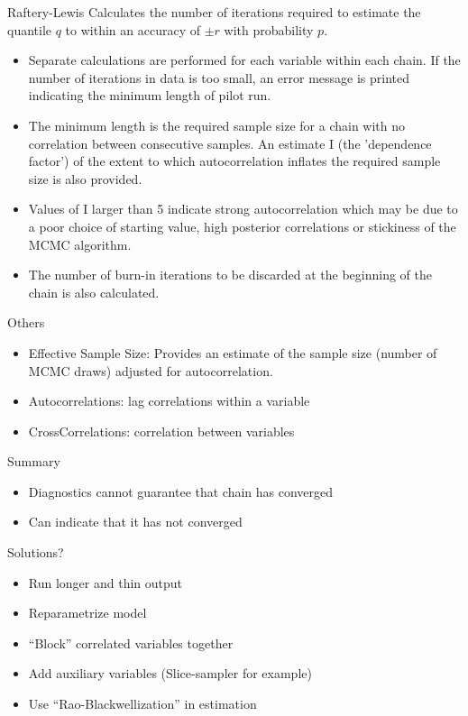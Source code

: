 \documentclass[dvips]{beamer}
\begin{document}
\begin{slide}{Raftery-Lewis}
Calculates the number of
iterations required to estimate the quantile $q$ to within an accuracy of $\pm r$ with probability $p$.
\begin{itemize}
\item  Separate calculations are performed for each variable within each chain.
If the number of iterations in data is too small, an error message is printed indicating the minimum
length of pilot run. 
\item The minimum length is the required sample size for a chain with no correlation
between consecutive samples.  An estimate I (the 'dependence factor') of the extent to which autocorrelation
inflates the required sample size is also provided. 
\item Values of I larger than 5 indicate strong
autocorrelation which may be due to a poor choice of starting value, high posterior correlations or
stickiness of the MCMC algorithm.

\item The number of burn-in iterations to be discarded at the beginning of the chain is also calculated.
\end{itemize}
  
\end{slide}
\begin{slide}{Others}
  \begin{itemize}
  \item Effective Sample Size:
Provides an estimate of the sample size (number of MCMC draws)
adjusted for autocorrelation.
\item Autocorrelations: lag correlations within a variable
\item CrossCorrelations: correlation between variables
  \end{itemize}

  
\end{slide}
\begin{slide}{Summary}
\begin{itemize}
\item Diagnostics cannot guarantee that chain has converged
\item Can indicate that it has not converged
\end{itemize}
Solutions?
\begin{itemize}
\item Run longer and thin output
\item Reparametrize model
\item ``Block'' correlated variables together
\item Add auxiliary variables (Slice-sampler for example)
\item Use ``Rao-Blackwellization'' in estimation

\end{itemize}
  
\end{slide}
\end{document}
